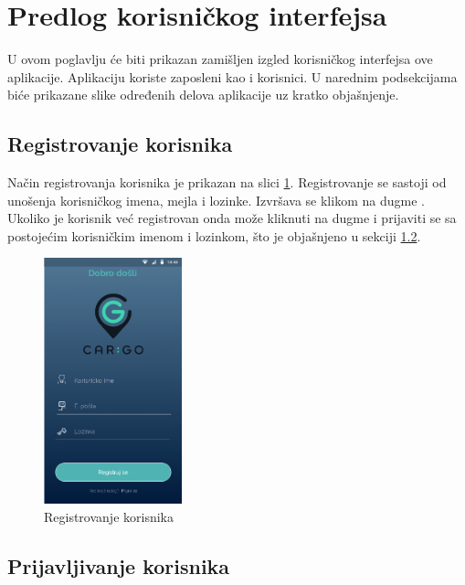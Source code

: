 \section{\bfseries Predlog korisničkog interfejsa}

U ovom poglavlju će biti prikazan zamišljen izgled korisničkog interfejsa ove aplikacije. Aplikaciju koriste zaposleni kao i korisnici. U narednim podsekcijama biće prikazane slike određenih delova aplikacije uz kratko objašnjenje.

\subsection{\bfseries Registrovanje korisnika}

Način registrovanja korisnika je prikazan na slici \ref{fig:Registrovanje korisnika}. Registrovanje se sastoji od unošenja korisničkog imena, mejla i lozinke.  Izvršava se klikom na dugme . Ukoliko je korisnik već registrovan onda može kliknuti na dugme  i prijaviti se sa postojećim korisničkim imenom i lozinkom, što je objašnjeno u sekciji \ref{Prijavljivanje_korisnika_sekcija}.

\begin{figure}[H]
\begin{center}
\includegraphics[width=4cm]{Slike/Registrovanje.png}
\end{center}
    \caption{Registrovanje korisnika}
\label{fig:Registrovanje korisnika}
\end{figure}


\subsection{\bfseries Prijavljivanje korisnika}
\label{Prijavljivanje_korisnika_sekcija}

